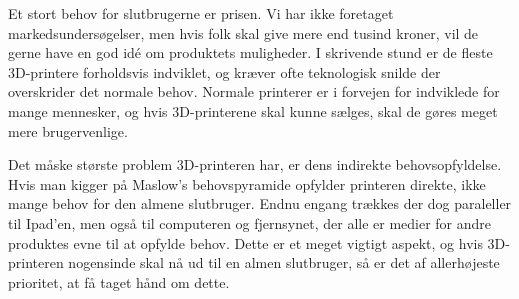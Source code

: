 Et stort behov for slutbrugerne er prisen. Vi har ikke foretaget markedsundersøgelser, men hvis folk skal give mere end tusind kroner, vil de gerne have en god idé om produktets muligheder. I skrivende stund er de fleste 3D-printere forholdsvis indviklet, og kræver ofte teknologisk snilde der overskrider det normale behov. Normale printerer er i forvejen for indviklede for mange mennesker, og hvis 3D-printerene skal kunne sælges, skal de gøres meget mere brugervenlige.

Det måske største problem 3D-printeren har, er dens indirekte behovsopfyldelse. Hvis man kigger på Maslow's behovspyramide \autocite{abraham_harold_maslow_theory_1943} opfylder printeren direkte, ikke mange behov for den almene slutbruger. Endnu engang trækkes der dog paraleller til Ipad'en, men også til computeren og fjernsynet, der alle er medier for andre produktes evne til at opfylde behov. Dette er et meget vigtigt aspekt, og hvis 3D-printeren nogensinde skal nå ud til en almen slutbruger, så er det af allerhøjeste prioritet, at få taget hånd om dette.